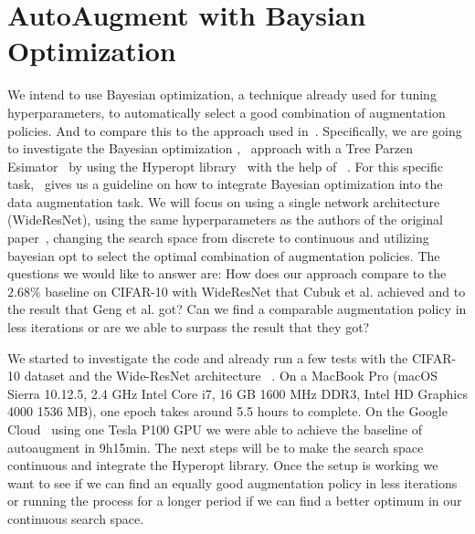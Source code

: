 \documentclass[10pt,twocolumn,letterpaper]{article}
\begin{document}
\section{AutoAugment with Baysian Optimization}

We intend to use Bayesian optimization, a technique already used for tuning hyperparameters, to automatically select a good combination of augmentation policies. And to compare this to the approach used in~\cite{Ekin}.
Specifically, we are going to investigate the Bayesian optimization \cite{2018arXiv180702811F},~\cite{Goodfellow-et-al-2016} approach with a Tree Parzen Esimator~\cite{Kaggle_AMT} by using the Hyperopt library~\cite{HyperOpt} with the help of~\cite{BO_Hyperopt} . For this specific task,~\cite{2017arXiv171010564T} gives us a guideline on how to integrate Bayesian optimization into the data augmentation task.
We will focus on using a single network architecture (WideResNet), using the same hyperparameters as the authors of the original paper~\cite{Ekin}, changing the search space from discrete to continuous and utilizing bayesian opt to select the optimal combination of augmentation policies. The questions we would like to answer are: How does our approach compare to the $2.68\%$ baseline on CIFAR-10 with WideResNet that Cubuk et al. achieved and to the result that Geng et al. got? Can we find a comparable augmentation policy in less iterations or are we able to surpass the result that they got?

We started to investigate the code and already run a few tests with the CIFAR-10 dataset and the Wide-ResNet architecture ~\cite{Ekin}. On a MacBook Pro (macOS Sierra 10.12.5, 2.4 GHz Intel Core i7, 16 GB 1600 MHz DDR3, Intel HD Graphics 4000 1536 MB), one epoch takes around 5.5 hours to complete. On the Google Cloud~\cite{GCloud} using one Tesla P100 GPU we were able to achieve the baseline of autoaugment in 9h15min.
The next steps will be to make the search space continuous and integrate the Hyperopt library. Once the setup is working we want to see if we can find an equally good augmentation policy in less iterations or running the process for a longer period if we can find a better optimum in our continuous search space.





{\small


}
\end{document}
